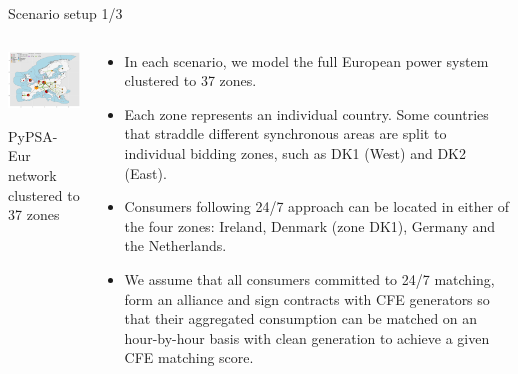 \begin{frame}{Scenario setup 1/3}
 
  \begin{columns}[T]
  \begin{column}{7.5cm}

  \vspace{0.3cm}
  \centering

  \includegraphics[width=7.5cm]{images/elec_s_37.png}

  {\footnotesize 
  PyPSA-Eur network clustered to 37 zones
  }
  \end{column}

  \begin{column}{8cm}
  {\small 
  \begin{itemize}
  \item In each scenario, we model the full European power system 
  clustered to \alert{37 zones}. 
    
  \item Each zone represents an individual country. Some countries
  that straddle different synchronous areas are split to individual bidding zones, 
  such as DK1 (West) and DK2 (East).

  \item Consumers following 24/7 approach can be located in either of the \alert{four zones}: 
  Ireland, Denmark (zone DK1), Germany and the Netherlands.
    
  \item We assume that all consumers committed to 24/7 matching, form an alliance and sign contracts 
  with CFE generators so that their aggregated consumption can be matched 
  on an hour-by-hour basis with clean generation to achieve a given CFE matching score.
  
  \end{itemize}
  }
  
  \end{column}
  \end{columns}

\end{frame}



